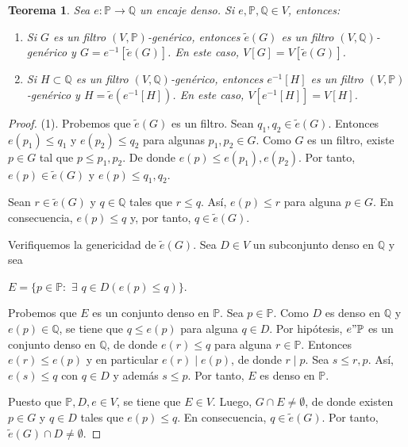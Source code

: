 \documentclass[11pt]{unam_tesis1}
\theoremstyle{MyThmStyle}
\theoremstyle{definition}
\theoremstyle{plain}
\newtheorem{theorem}[definition]{Teorema}
\theoremstyle{remark}
\let\leq\leqslant
\begin{document}
\begin{theorem}\label{igualdadextensiones}
Sea $e:\mathbb P\rightarrow \mathbb Q$ un encaje denso. Si $e,\mathbb P,\mathbb Q\in V$, entonces:
\begin{enumerate}
\item  Si $G$ es un filtro $(V, \mathbb P)$-gen\'erico, entonces $\tilde e(G)$ es un filtro $(V,\mathbb Q)$-gen\'erico y $G=e^{-1}[\tilde e(G)]$. En este caso, $V[G]=V[\tilde e(G)]$.
\item  Si $H\subset \mathbb Q$ es un filtro $(V,\mathbb Q)$-gen\'erico, entonces $e^{-1}[H]$ es un filtro $(V, \mathbb P)$-gen\'erico y $H= \tilde e(e^{-1}[H])$. En este caso, $V[e^{-1}[H]] = V[H]$.
\end{enumerate}
\end{theorem}

\begin{proof}
(1). Probemos que $\tilde e(G)$ es un filtro. Sean $q_1,q_2\in \tilde e(G)$. Entonces $e(p_1)\leq q_1$ y $e(p_2)\leq q_2$ para algunas $p_1,p_2\in G$. Como $G$ es un filtro, existe $p\in G$ tal que $p\leq p_1,p_2$. De donde $e(p)\leq e(p_1),e(p_2)$. Por tanto, $e(p)\in \tilde{e}(G)$ y $e(p)\leq q_1,q_2$.

Sean $r\in \tilde e(G)$ y $q\in \mathbb Q$ tales que $r\leq q$. As\'i, $e(p)\leq r$ para alguna $p\in G$. En consecuencia, $e(p)\leq q$ y, por tanto, $q\in \tilde e(G)$.

Verifiquemos la genericidad de $\tilde e(G)$. Sea $D\in V$ un subconjunto denso en $\mathbb Q$ y sea

\begin{center}
$E=\{p\in \mathbb P:$ $\exists$ $q\in D (e(p)\leq q) \}$.
\end{center}

Probemos que $E$ es un conjunto denso en $\mathbb P$. Sea $p\in \mathbb P$. Como $D$ es denso en $\mathbb Q$ y $e(p)\in \mathbb Q$, se tiene que $q\leq e(p)$ para alguna $q\in D$. Por hip\'otesis, $e"\mathbb P$ es un conjunto denso en $\mathbb Q$, de donde $e(r)\leq q$ para alguna $r\in \mathbb P$. Entonces $e(r)\leq e(p)$ y en particular $e(r)\mid e(p)$, de donde $r\mid p$. Sea $s\leq r,p$. As\'i, $e(s)\leq  q$ con $q\in D$ y adem\'as $s\leq p$. Por tanto, $E$ es denso en $\mathbb P$.

Puesto que $\mathbb P,D,e\in V$, se tiene que $E\in V$. Luego, $G\cap E\neq \emptyset$, de donde existen $p\in G$ y $q\in D$ tales que $e(p)\leq q$. En consecuencia, $q\in \tilde e(G)$. Por tanto, $\tilde e(G)\cap D\neq \emptyset$.


\end{proof}
\end{document}
